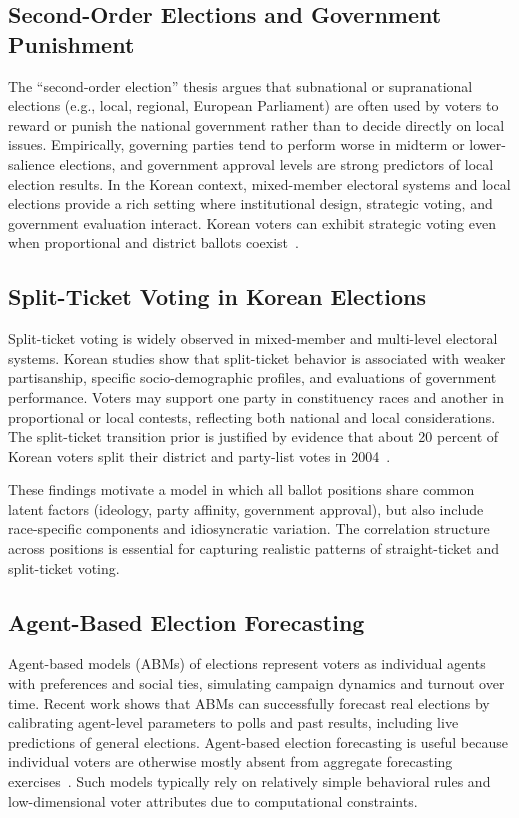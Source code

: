 \documentclass[11pt]{article}
\begin{document}
\subsection{Second-Order Elections and Government Punishment}

The ``second-order election'' thesis argues that subnational or supranational elections (e.g., local, regional, European Parliament) are often used by voters to reward or punish the national government rather than to decide directly on local issues. Empirically, governing parties tend to perform worse in midterm or lower-salience elections, and government approval levels are strong predictors of local election results. In the Korean context, mixed-member electoral systems and local elections provide a rich setting where institutional design, strategic voting, and government evaluation interact. Korean voters can exhibit strategic voting even when proportional and district ballots coexist~\cite{choi2006strategic}.

\subsection{Split-Ticket Voting in Korean Elections}

Split-ticket voting is widely observed in mixed-member and multi-level electoral systems. Korean studies show that split-ticket behavior is associated with weaker partisanship, specific socio-demographic profiles, and evaluations of government performance. Voters may support one party in constituency races and another in proportional or local contests, reflecting both national and local considerations. The split-ticket transition prior is justified by evidence that about 20 percent of Korean voters split their district and party-list votes in 2004~\cite{splitticket_korea}.

These findings motivate a model in which all ballot positions share common latent factors (ideology, party affinity, government approval), but also include race-specific components and idiosyncratic variation. The correlation structure across positions is essential for capturing realistic patterns of straight-ticket and split-ticket voting.

\subsection{Agent-Based Election Forecasting}

Agent-based models (ABMs) of elections represent voters as individual agents with preferences and social ties, simulating campaign dynamics and turnout over time. Recent work shows that ABMs can successfully forecast real elections by calibrating agent-level parameters to polls and past results, including live predictions of general elections. Agent-based election forecasting is useful because individual voters are otherwise mostly absent from aggregate forecasting exercises~\cite{gergaud2022abmelections}. Such models typically rely on relatively simple behavioral rules and low-dimensional voter attributes due to computational constraints.
\end{document}
